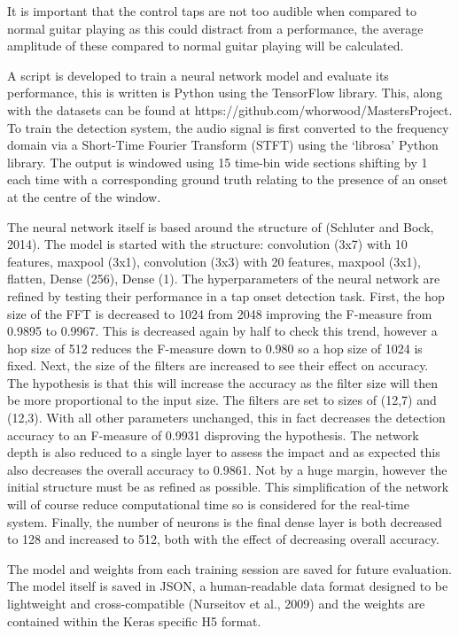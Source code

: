 \documentclass[conference]{IEEEtran}
\begin{document}
It is important that the control taps are not too audible when compared to normal guitar playing as this could distract from a performance, the average amplitude of these compared to normal guitar playing will be calculated.

A script is developed to train a neural network model and evaluate its performance, this is written is Python using the TensorFlow library. This, along with the datasets can be found at https://github.com/whorwood/MastersProject. To train the detection system, the audio signal is first converted to the frequency domain via a Short-Time Fourier Transform (STFT) using the `librosa' Python library. The output is windowed
using 15 time-bin wide sections shifting by 1 each time with a corresponding ground truth relating to the presence of an onset at the centre of the window.

The neural network itself is based around the structure of (Schluter and Bock, 2014). The model is started with the structure: convolution (3x7) with 10 features, maxpool (3x1), convolution (3x3) with 20 features, maxpool (3x1), flatten, Dense (256), Dense (1).
The hyperparameters of the neural network are refined by testing their performance in a tap onset detection task. First, the hop size of the FFT is decreased to 1024 from 2048 improving the F-measure from 0.9895 to 0.9967. This is decreased again by half to check this trend,
however a hop size of 512 reduces the F-measure down to 0.980 so a hop size of 1024 is fixed. Next, the size of the filters are increased to see their effect on accuracy. The hypothesis is that this will increase the accuracy as the filter size will then be
more proportional to the input size. The filters are set to sizes of (12,7) and (12,3). With all other parameters unchanged, this in fact decreases the detection accuracy to an F-measure of 0.9931 disproving the hypothesis. The network depth is also reduced to a single layer to assess the impact
and as expected this also decreases the overall accuracy to 0.9861. Not by a huge margin, however the initial structure must be as refined as possible. This simplification of the network will of course reduce computational time so is considered for the real-time system. 
Finally, the number of neurons is the final dense layer is both decreased to 128 and increased to 512, both with the effect of decreasing overall accuracy.

The model and weights from each training session are saved for future evaluation. The model itself is saved in JSON, a human-readable data format designed to be lightweight and cross-compatible (Nurseitov et al., 2009) and the weights are contained within the Keras specific H5 format. 
\end{document}
